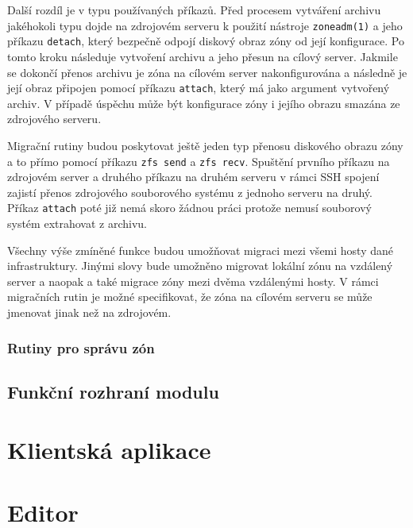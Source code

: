 Další rozdíl je v typu používaných příkazů. Před procesem vytváření archivu jakéhokoli typu dojde na zdrojovém serveru k 
použití nástroje \verb|zoneadm(1)| a jeho příkazu \verb|detach|, který bezpečně odpojí diskový obraz zóny od její konfigurace.
Po tomto kroku následuje vytvoření archivu a jeho přesun na cílový server. Jakmile se dokončí přenos archivu je zóna na cílovém
server nakonfigurována a následně je její obraz připojen pomocí příkazu \verb|attach|, který má jako argument vytvořený archiv.
V případě úspěchu může být konfigurace zóny i jejího obrazu smazána ze zdrojového serveru.

Migrační rutiny budou poskytovat ještě jeden typ přenosu diskového obrazu zóny a to přímo pomocí příkazu \verb|zfs send|
a \verb|zfs recv|. Spuštění prvního příkazu na zdrojovém server a druhého příkazu na druhém serveru v rámci SSH spojení
zajistí přenos zdrojového souborového systému z jednoho serveru na druhý. Příkaz \verb|attach| poté již nemá skoro žádnou práci
protože nemusí souborový systém extrahovat z archivu.

Všechny výše zmíněné funkce budou umožňovat migraci mezi všemi hosty dané infrastruktury. Jinými slovy bude umožněno migrovat 
lokální zónu na vzdálený server a naopak a také migrace zóny mezi dvěma vzdálenými hosty. V rámci migračních rutin je možné specifikovat,
že zóna na cílovém serveru se může jmenovat jinak než na zdrojovém.
\subsubsection{Rutiny pro správu zón}
\label{chapter:implementation:szones:routines:management}

\subsection{Funkční rozhraní modulu}
\label{chapter:implementation:szones:api}
\section{Klientská aplikace}
\section{Editor}